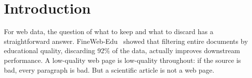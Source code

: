 %
%

\section{Introduction}

\begin{reviewread}
For web data, the question of what to keep and what to discard has a straightforward answer. FineWeb-Edu~\citep{penedo2024fineweb} showed that filtering entire documents by educational quality, discarding 92\% of the data, actually improves downstream performance. A low-quality web page is low-quality throughout: if the source is bad, every paragraph is bad. But a scientific article is not a web page.
\end{reviewread}

